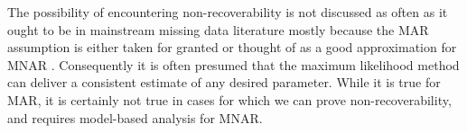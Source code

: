 \documentclass[12pt]{article}
\begin{document}
 The possibility of encountering non-recoverability is not discussed as often as it ought to be in mainstream missing data literature mostly because the MAR assumption is either taken for granted \citep{Pfeffermann} or thought of as a good approximation for MNAR \citep{chang2011modern}. Consequently it is often presumed that the maximum likelihood method can deliver a consistent estimate of any desired parameter.  While it is true for MAR, it is certainly not true in cases for which we can prove non-recoverability, and requires model-based analysis for MNAR. 		
		
		
\end{document}
